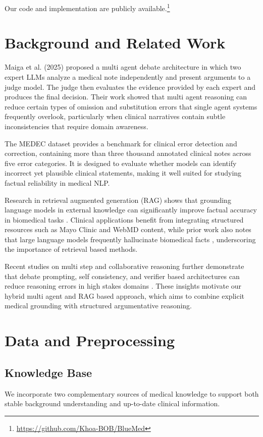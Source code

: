 \documentclass[11pt]{article}
\begin{document}
\noindent Our code and implementation are publicly available.\footnote{\url{https://github.com/Khoa-BOB/BlueMed}}

\section{Background and Related Work}

Maiga et al. (2025) proposed a multi agent debate architecture in which two expert LLMs analyze a medical note independently and present arguments to a judge model. The judge then evaluates the evidence provided by each expert and produces the final decision. Their work showed that multi agent reasoning can reduce certain types of omission and substitution errors that single agent systems frequently overlook, particularly when clinical narratives contain subtle inconsistencies that require domain awareness.


The MEDEC dataset \citep{benabacha2024medec} provides a benchmark for clinical error detection and correction, containing more than three thousand annotated clinical notes across five error categories. It is designed to evaluate whether models can identify incorrect yet plausible clinical statements, making it well suited for studying factual reliability in medical NLP.


Research in retrieval augmented generation (RAG) shows that grounding language models in external knowledge can significantly improve factual accuracy in biomedical tasks \citep{lewis2020rag,izacard2021leveraging}. Clinical applications benefit from integrating structured resources such as Mayo Clinic and WebMD content, while prior work also notes that large language models frequently hallucinate biomedical facts \citep{ji2023survey}, underscoring the importance of retrieval based methods.


Recent studies on multi step and collaborative reasoning further demonstrate that debate prompting, self consistency, and verifier based architectures can reduce reasoning errors in high stakes domains \citep{du2023improving,shinn2023reflexion}. These insights motivate our hybrid multi agent and RAG based approach, which aims to combine explicit medical grounding with structured argumentative reasoning.
\section{Data and Preprocessing}

\subsection{Knowledge Base}
We incorporate two complementary sources of medical knowledge to support both stable background understanding and up-to-date clinical information.
\end{document}
